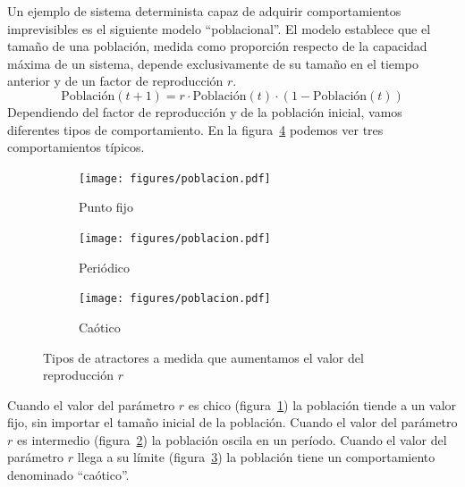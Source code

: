 \documentclass[a4paper,10pt]{book}
\begin{document}

Un ejemplo de sistema determinista capaz de adquirir comportamientos imprevisibles es el siguiente modelo ``poblacional''.
El modelo establece que el tamaño de una población, medida como proporción respecto de la capacidad máxima de un sistema, depende exclusivamente de su tamaño en el tiempo anterior y de un factor de reproducción $r$.
\begin{equation}
 \text{Población}(t+1) = r \cdot \text{Población}(t)\cdot (1-\text{Población}(t))
\end{equation}
Dependiendo del factor de reproducción y de la población inicial, vamos diferentes tipos de comportamiento.
En la figura~\ref{fig:poblacion} podemos ver tres comportamientos típicos.
\begin{figure}[ht!]
    \centering
    \begin{subfigure}[b]{0.32\textwidth}
    \texttt{[image: figures/poblacion.pdf]}
    \caption{Punto fijo}
    \label{fig:poblacion_punto_fijo}
    \end{subfigure}
    \begin{subfigure}[b]{0.32\textwidth}
    \texttt{[image: figures/poblacion.pdf]}
    \caption{Periódico}
    \label{fig:poblacion_periodico}
    \end{subfigure}
    \begin{subfigure}[b]{0.32\textwidth}
    \texttt{[image: figures/poblacion.pdf]}
    \caption{Caótico}
    \label{fig:poblacion_caotico}
    \end{subfigure}
    \caption{
    Tipos de atractores a medida que aumentamos el valor del reproducción $r$
    }
    \label{fig:poblacion}
\end{figure}
Cuando el valor del parámetro $r$ es chico (figura~\ref{fig:poblacion_punto_fijo}) la población tiende a un valor fijo, sin importar el tamaño inicial de la población.
Cuando el valor del parámetro $r$ es intermedio (figura~\ref{fig:poblacion_periodico}) la población oscila en un período.
Cuando el valor del parámetro $r$ llega a su límite (figura~\ref{fig:poblacion_caotico}) la población tiene un comportamiento denominado ``caótico''.

\end{document}
